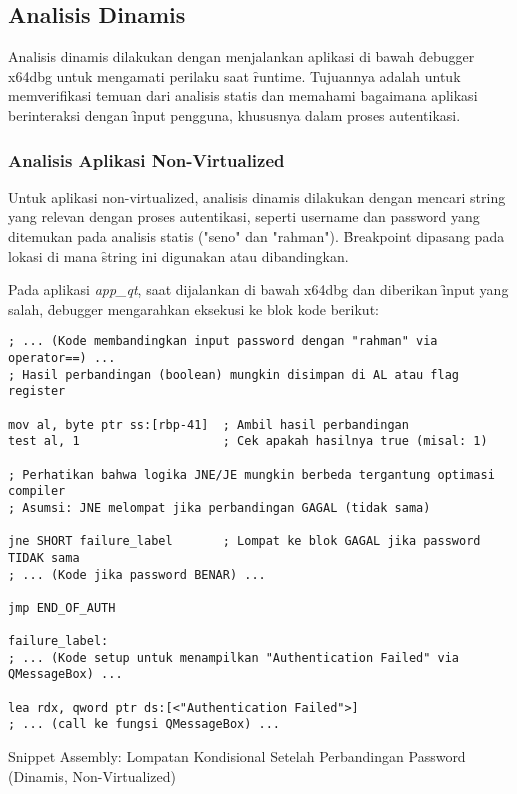 \subsection{Analisis Dinamis}
Analisis dinamis dilakukan dengan menjalankan aplikasi di bawah \f{debugger} x64dbg untuk mengamati perilaku saat \f{runtime}. Tujuannya adalah untuk memverifikasi temuan dari analisis statis dan memahami bagaimana aplikasi berinteraksi dengan \f{input} pengguna, khususnya dalam proses autentikasi.

\subsubsection{Analisis Aplikasi Non-Virtualized}

Untuk aplikasi non-virtualized, analisis dinamis dilakukan dengan mencari string yang relevan dengan proses autentikasi, seperti username dan password yang ditemukan pada analisis statis ("seno" dan "rahman"). \f{Breakpoint} dipasang pada lokasi di mana \f{string} ini digunakan atau dibandingkan.

Pada aplikasi \textit{app\_qt}, saat dijalankan di bawah x64dbg dan diberikan \f{input} yang salah, \f{debugger} mengarahkan eksekusi ke blok kode berikut:

\begin{listing}[H]
    \begin{verbatim}
; ... (Kode membandingkan input password dengan "rahman" via operator==) ...
; Hasil perbandingan (boolean) mungkin disimpan di AL atau flag register

mov al, byte ptr ss:[rbp-41]  ; Ambil hasil perbandingan
test al, 1                    ; Cek apakah hasilnya true (misal: 1)

; Perhatikan bahwa logika JNE/JE mungkin berbeda tergantung optimasi compiler
; Asumsi: JNE melompat jika perbandingan GAGAL (tidak sama)

jne SHORT failure_label       ; Lompat ke blok GAGAL jika password TIDAK sama
; ... (Kode jika password BENAR) ...

jmp END_OF_AUTH

failure_label:
; ... (Kode setup untuk menampilkan "Authentication Failed" via QMessageBox) ...

lea rdx, qword ptr ds:[<"Authentication Failed">]
; ... (call ke fungsi QMessageBox) ...

\end{verbatim}
\caption{Snippet Assembly: Lompatan Kondisional Setelah Perbandingan Password (Dinamis, Non-Virtualized)}
\label{lst:asm_dynamic_nonvirt_snippet_rev} %
\end{listing}

